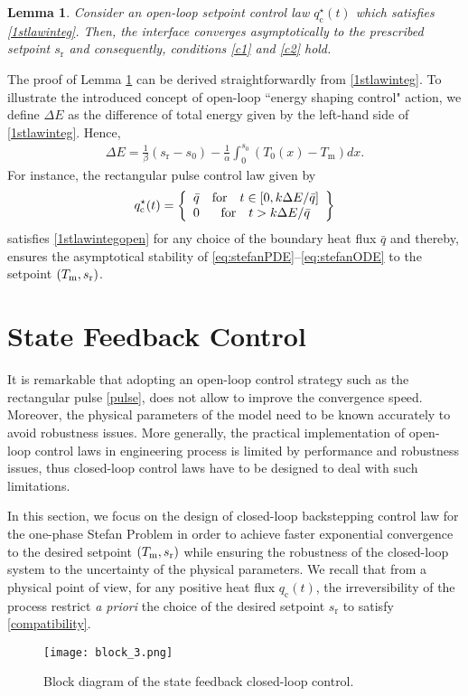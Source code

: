 \documentclass[journal]{IEEEtran}
\newtheorem{lem}{Lemma}
\begin{document}
\begin{lem}\label{rec*}
Consider an open-loop setpoint control law  $q^{\star}_{{\mathrm c}}(t)$ which satisfies \eqref{1stlawinteg}.  Then, the interface converges asymptotically to the prescribed setpoint $s_{{\mathrm r}}$ and consequently, conditions \eqref{c1} and \eqref{c2} hold. \end{lem}
The proof of Lemma \ref{rec*} can be derived straightforwardly from \eqref{1stlawinteg}.
To illustrate the introduced concept of  open-loop ``energy shaping control" action, we define $\Delta E$ as the difference of total energy given by the left-hand side of \eqref{1stlawinteg}. Hence,
\begin{align}\label{1stlawintegopen}
\Delta E= \frac{1}{\beta}(s_{{\mathrm r}}-s_0)-\frac{1}{\alpha}\int_{0}^{s_0} (T_0(x)-T_{{\mathrm m}}) dx.
\end{align}
For instance, the rectangular pulse control law given by
\begin{align}\label{pulse}
q^{\star}_{{\mathrm c}}(t) = 
\left \{
\begin{array}{cc}
\bar{q} &{\rm for}\quad t\in [0, k\Delta E/\bar{q}]\\
0  &{\rm for}\quad t>k\Delta E/\bar{q}
\end{array}
\right \}
\end{align}
satisfies \eqref{1stlawintegopen} for any choice of the boundary heat flux $\bar{q}$ and thereby, ensures the asymptotical stability of  \eqref{eq:stefanPDE}--\eqref{eq:stefanODE} to the setpoint $(T_{\rm m}, s_{{\mathrm r}})$.

\section{State Feedback Control }\label{state-feedback}

It is remarkable that adopting an open-loop control strategy such as the rectangular pulse \eqref{pulse}, does not allow  to improve the convergence speed. Moreover, the physical parameters of the model need to be   known accurately to avoid robustness issues. More generally, the practical implementation of open-loop control laws in engineering process is limited by performance and robustness issues, thus closed-loop control laws have to be designed to deal with such limitations. 

In this section, we focus on the design of closed-loop backstepping control law for the one-phase Stefan Problem in order to  achieve faster exponential convergence to the desired setpoint $(T_{\rm m}, s_{{\mathrm r}})$ while ensuring the robustness of the closed-loop system to the uncertainty of the physical parameters. We recall that from a physical point of view, for any positive heat flux $q_{{\mathrm c}}(t)$,  the irreversibility of the process restrict \emph{a priori} the choice of the desired setpoint $s_{{\mathrm r}}$ to satisfy \eqref{compatibility}.
\begin{figure}[t]
\centering
\texttt{[image: block\_3.png]}
\caption{Block diagram of the state feedback closed-loop control.}\label{statediag}
\end{figure}
\end{document}
